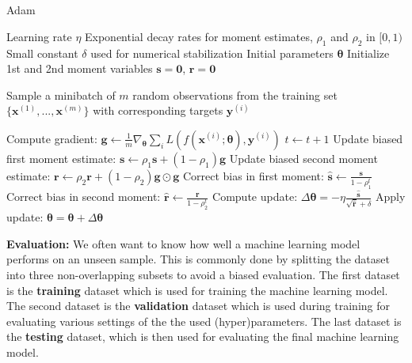 \documentclass[./main.tex]{subfiles}
\begin{document}
\\
\\
\begin{algorithm}[htbp]
    \caption{Adam \cite{DL_book}}
    \label{Algorithm:ADAM}
    \begin{algorithmic}
        \Require Learning rate $\eta$
        \Require Exponential decay rates for moment estimates, $\rho_1$ and $\rho_2$ in $[0, 1)$
        \Require Small constant $\delta$ used for numerical stabilization
        \Require Initial parameters $\bm{\theta}$
        \State Initialize 1st and 2nd moment variables $\bm{s} = \bm{0}$, $\bm{r} = \bm{0}$

            \State \begin{varwidth}[t]{\linewidth} Sample a minibatch of $m$ random observations from the training set $\{\bm{x}^{(1)}, ..., \bm{x}^{(m)}\}$ with corresponding targets $\bm{y}^{(i)}$
            \end{varwidth}
            \State Compute gradient: $\bm{g}  \leftarrow  \frac{1}{m} \nabla_{\bm{\theta}} \sum_i L\left( f \left(\bm{x}^{(i)}; \bm{\theta} \right), \bm{y}^{(i)} \right)$
            \State $t \leftarrow t + 1$
            \State Update biased first moment estimate: $\bm{s} \leftarrow \rho_1 \bm{s} + (1 - \rho_1) \bm{g}$
            \State Update biased second moment estimate: $\bm{r} \leftarrow \rho_2 \bm{r} + (1 - \rho_2) \bm{g} \odot \bm{g}$
            \State Correct bias in first moment: $\hat{\bm{s}} \leftarrow \frac{\bm{s}}{1 - \rho_1 ^t}$
            \State Correct bias in second moment: $\hat{\bm{r}} \leftarrow \frac{\bm{r}}{1 - \rho_2 ^t}$
            \State Compute update: $\Delta \bm{\theta} = - \eta \frac{\hat{\bm{s}}}{\sqrt{\hat{\bm{r}}} + \delta}$
            \State Apply update: $\bm{\theta} = \bm{\theta} + \Delta \bm{\theta}$ 
        \EndWhile
    \end{algorithmic}
\end{algorithm}
\noindent \textbf{Evaluation:} We often want to know how well a machine learning model performs on an unseen sample. This is commonly done by splitting the dataset into three non-overlapping subsets to avoid a biased evaluation. The first dataset is the \textbf{training} dataset which is used for training the machine learning model. The second dataset is the \textbf{validation} dataset which is used during training for evaluating various settings of the the used (hyper)parameters. The last dataset is the \textbf{testing} dataset, which is then used for evaluating the final machine learning model.
\end{document}
